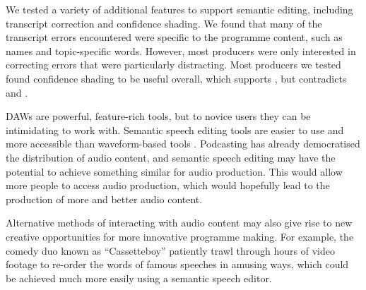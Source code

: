 

We tested a variety of additional features to support semantic editing, including transcript correction and confidence
shading.
We found that many of the transcript errors encountered were specific to the
programme content, such as names and topic-specific words.  However, most producers were only interested in correcting
errors that were particularly distracting.  Most producers we tested found confidence shading to be useful overall,
which supports \citet{Burke2006}, but contradicts \citet{Suhm2001} and \citet{Vemuri2004}.






DAWs are powerful, feature-rich tools, but to novice users they can be intimidating to work with.  Semantic speech
editing tools are easier to use and more accessible than waveform-based tools \citep{Yoon2014,Sivaraman2016}.
Podcasting has already democratised the distribution of audio content, and semantic speech editing may have the
potential to achieve something similar for audio production. This would allow more people to access audio production,
which would hopefully lead to the production of more and better audio content.

Alternative methods of interacting with audio content may also give rise to new creative opportunities for more
innovative programme making.  For example, the comedy duo known as ``Cassetteboy'' \citep{Perraudin2014} patiently
trawl through hours of video footage to re-order the words of famous speeches in amusing ways, which could be achieved
much more easily using a semantic speech editor.

